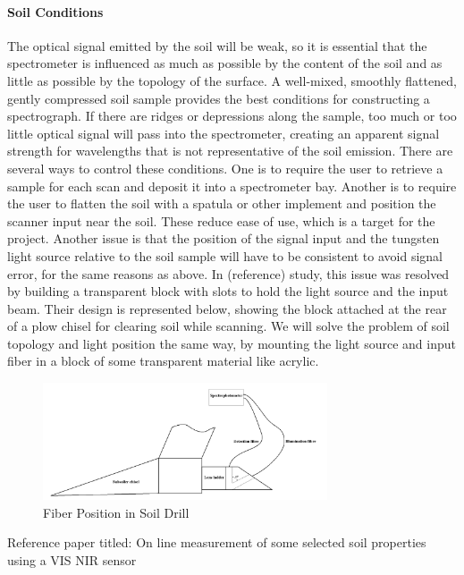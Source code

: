 \paragraph{Soil Conditions} The optical signal emitted by the soil will be weak, so it is essential that the spectrometer is influenced as much as possible by the content of the soil and as little as possible by the topology of the surface. A well-mixed, smoothly flattened, gently compressed soil sample provides the best conditions for constructing a spectrograph. If there are ridges or depressions along the sample, too much or too little optical signal will pass into the spectrometer, creating an apparent signal strength for wavelengths that is not representative of the soil emission. There are several ways to control these conditions. One is to require the user to retrieve a sample for each scan and deposit it into a spectrometer bay. Another is to require the user to flatten the soil with a spatula or other implement and position the scanner input near the soil. These reduce ease of use, which is a target for the project. Another issue is that the position of the signal input and the tungsten light source relative to the soil sample will have to be consistent to avoid signal error, for the same reasons as above. In (reference) study, this issue was resolved by building a transparent block with slots to hold the light source and the input beam. Their design is represented below, showing the block attached at the rear of a plow chisel for clearing soil while scanning. We will solve the problem of soil topology and light position the same way, by mounting the light source and input fiber in a block of some transparent material like acrylic.

\begin{figure}[H]
    \caption{Fiber Position in Soil Drill}
    \centering
    \includegraphics[width=0.75\textwidth]{images/Acrylic Block Fiber positioner.png}
\end{figure}
Reference paper titled: On line measurement of some selected soil properties using a VIS NIR sensor

